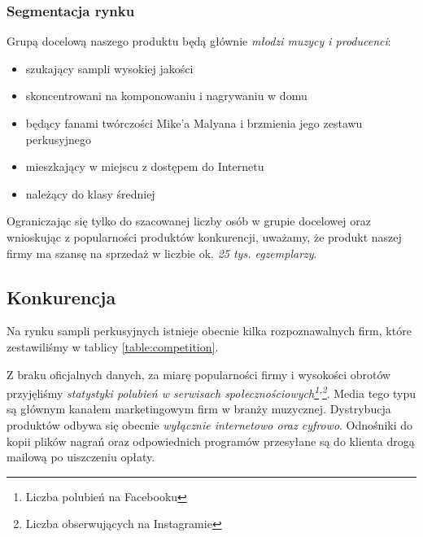 \documentclass[12pt]{article}
\begin{document}

\subsubsection{Segmentacja rynku}


Grupą docelową naszego produktu będą głównie \emph{młodzi muzycy i producenci}:
\begin{itemize}
    \item szukający sampli wysokiej jakości
    \item skoncentrowani na komponowaniu i nagrywaniu w domu
    \item będący fanami twórczości Mike'a Malyana i brzmienia jego zestawu perkusyjnego
    \item mieszkający w miejscu z dostępem do Internetu
    \item należący do klasy średniej
\end{itemize}

Ograniczając się tylko do szacowanej liczby osób w grupie docelowej oraz wnioskując z popularności produktów konkurencji, uważamy, że produkt naszej firmy ma szansę na sprzedaż w liczbie ok. \emph{25 tys. egzemplarzy}.

\subsection{Konkurencja}


Na rynku sampli perkusyjnych istnieje obecnie kilka rozpoznawalnych firm, które zestawiliśmy w tablicy \ref{table:competition}.

Z braku oficjalnych danych, za miarę popularności firmy i wysokości obrotów przyjęliśmy \emph{statystyki polubień w serwisach społecznościowych\footnote{Liczba polubień na Facebooku\label{footnote:facebook}}\textsuperscript{,}\footnote{Liczba obserwujących na Instagramie\label{footnote:instagram}}}.
Media tego typu są głównym kanałem marketingowym firm w branży muzycznej.
Dystrybucja produktów odbywa się obecnie \emph{wyłącznie internetowo oraz cyfrowo}.
Odnośniki do kopii plików nagrań oraz odpowiednich programów przesyłane są do klienta drogą mailową po uiszczeniu opłaty.
\end{document}

